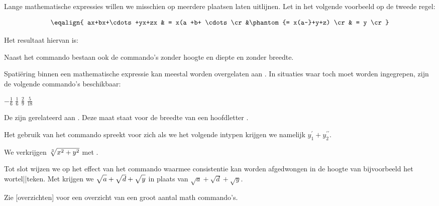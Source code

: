 Lange mathematische expressies willen we misschien op
meerdere plaatsen laten uitlijnen. Let in het volgende
voorbeeld op de tweede regel:

\startbuffer
$$\eqalign{
     ax+bx+\cdots+yx+zx &         = x(a +b+ \cdots \cr
                        &\phantom{= x(a~}+y+z)     \cr
                        &         = y              \cr}$$
\stopbuffer

\typebuffer

Het resultaat hiervan is:

\startformule
{}
\stopformule

Naast het commando \type{\phantom} bestaan ook de commando's
\type{\hphantom} zonder hoogte en diepte en \type{\vphantom}
zonder breedte.

Spati\"ering binnen een mathematische expressie kan meestal
worden overgelaten aan \TEX. In situaties waar toch moet
worden ingegrepen, zijn de volgende commando's beschikbaar:

\starttabulatie[|l|r|]
\NC \type{\!} \NC $-\frac{1}{6}$\type{\quad} \NC\NR
\NC \type{\,} \NC $\frac{1}{6}$\type{\quad}  \NC\NR
\NC \type{\>} \NC $\frac{2}{9}$\type{\quad}  \NC\NR
\NC \type{\;} \NC $\frac{5}{18}$\type{\quad} \NC\NR
\stoptabulatie

De  zijn gerelateerd aan \type{\quad}. Deze
maat staat voor de breedte van een hoofdletter .

Het gebruik van het commando \type{\prime} spreekt voor zich
als we het volgende intypen 
krijgen we namelijk $y_1^\prime+y_2^{\prime\prime}$.

We verkrijgen $\root 3 \of {x^2+y^2}$ met
.

Tot slot wijzen we op het effect van het commando
\type{\mathstrut} waarmee consistentie kan worden
afgedwongen in de hoogte van bijvoorbeeld het wortel||teken.
Met 
krijgen we $\sqrt{\mathstrut a}+\sqrt{\mathstrut d}+\sqrt{\mathstrut y}$
in plaats van $\sqrt{a}+\sqrt{d}+\sqrt{y}$.

Zie [overzichten] voor een overzicht van
een groot aantal math commando's.



